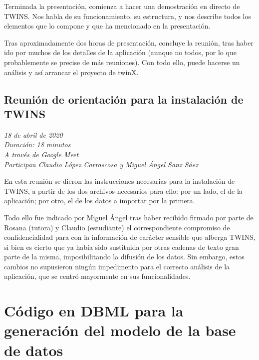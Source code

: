 	Terminada la presentación, comienza a hacer una demostración en directo de TWINS. Nos habla de su funcionamiento, su estructura, y nos describe todos los elementos que lo compone y que ha mencionado en la presentación.
	
	Tras aproximadamente dos horas de presentación, concluye la reunión, tras haber ido por muchos de los detalles de la aplicación (aunque no todos, por lo que probablemente se precise de más reuniones). Con todo ello, puede hacerse un análisis y así arrancar el proyecto de twinX.
		
	\section{Reunión de orientación para la instalación de TWINS}
	\label{reunion4}
	
	\textit{18 de abril de 2020}\\
	
	\textit{Duración: 18 minutos}\\
	
	\textit{A través de Google Meet}\\
	
	\textit{Participan Claudio López Carrascosa y Miguel Ángel Sanz Sáez}
	
	En esta reunión se dieron las instrucciones necesarias para la instalación de TWINS, a partir de los dos archivos necesarios para ello: por un lado, el de la aplicación; por otro, el de los datos a importar por la primera.
	
	Todo ello fue indicado por Miguel Ángel tras haber recibido firmado por parte de Rosana (tutora) y Claudio (estudiante) el correspondiente compromiso de confidencialidad para con la información de carácter sensible que alberga TWINS, si bien es cierto que ya había sido sustituida por otras cadenas de texto gran parte de la misma, imposibilitando la difusión de los datos. Sin embargo, estos cambios no supusieron ningún impedimento para el correcto análisis de la aplicación, que se centró mayormente en sus funcionalidades.
	
	\chapter{Código en DBML para la generación del modelo de la base de datos}
	\label{anexo:dbml}
	
